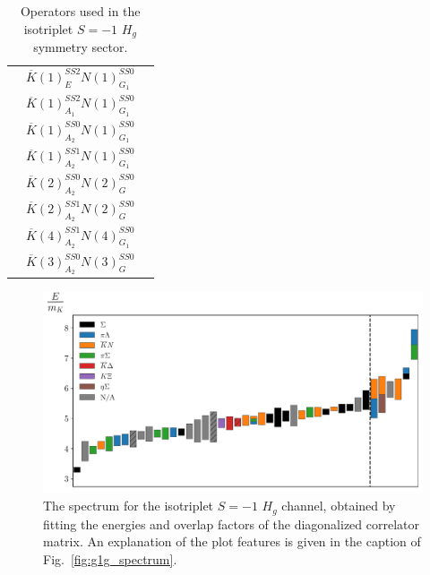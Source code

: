 \begin{table}[H]
\begin{tabular}{l|l|l}
        & $\overline K(1)_{E}^{SS2}N(1)_{G_1}^{SS0}$ &\\
        & $\overline K(1)_{A_1}^{SS2}N(1)_{G_1}^{SS0}$ &\\
        & $\overline K(1)_{A_2}^{SS0}N(1)_{G_1}^{SS0}$ &\\
        & $\overline K(1)_{A_2}^{SS1}N(1)_{G_1}^{SS0}$ &\\
         & $\overline K(2)_{A_2}^{SS0}N(2)_{G}^{SS0}$ &\\
         & $\overline K(2)_{A_2}^{SS1}N(2)_{G}^{SS0}$ &\\
         & $\overline K(4)_{A_2}^{SS1}N(4)_{G_1}^{SS0}$ &\\
         & $\overline K(3)_{A_2}^{SS0}N(3)_{G}^{SS0}$ &\\
    \end{tabular}
    \caption{Operators used in the isotriplet $S=-1$ $H_g$ symmetry sector.}\label{table:hg_ops}
\end{table}
\begin{figure}[H]
    \centering
    \hspace*{-0.5in}\includegraphics[width=\textwidth]{figures/sigmas/hg/staircase_mk.pdf}
    \caption[The spectrum for the isotriplet $S=-1$ $H_g$ channel, obtained by fitting the energies and overlap factors of the diagonalized correlator matrix.]{The spectrum for the isotriplet $S=-1$ $H_g$ channel, obtained by fitting the energies and overlap factors of the diagonalized correlator matrix. An explanation of the plot features is given in the caption of Fig.~\ref{fig:g1g_spectrum}.}\label{fig:hg_spectrum}
\end{figure}

